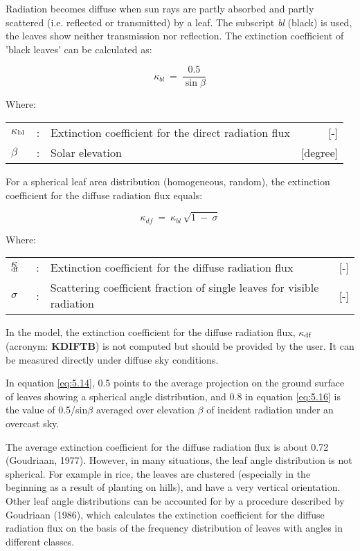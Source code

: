 Radiation becomes diffuse when sun rays are partly absorbed and partly scattered (i.e.
reflected or transmitted) by a leaf. The subscript {\it bl} (black) is used, the leaves show
neither transmission nor reflection. The extinction coefficient of 'black leaves'
can be calculated as:

\begin{equation}
\label{eq:5.14}
\kappa_{bl} ~=~{\frac{0.5}{\sin \beta }}
\end{equation}

Where:\\[5pt]
\begin{tabularx}{\textwidth}{llXr}
	$\kappa$$_{{\rm bl}}$ &:& Extinction coefficient for the direct radiation flux   &     [-]\\
	$\beta$ &:& Solar elevation    &    [degree]\\
\end{tabularx}

For a spherical leaf area distribution (homogeneous, random), the extinction coefficient
for the diffuse radiation flux equals:

\begin{equation}
\label{eq:5.15}
\kappa_{df} ~=~ \kappa_{bl} \, \sqrt{1~-~ \sigma }
\end{equation}

Where:\\[5pt]
\begin{tabularx}{\textwidth}{llXr}
	$\kappa$$_{{\rm df}}$ &:& Extinction coefficient for the diffuse radiation flux    &    [-]\\
	$\sigma$ &:& Scattering coefficient fraction of single leaves for 
	visible radiation    &    [-]\\
\end{tabularx}

In the model, the extinction coefficient for the diffuse radiation flux, 
{\bf $\kappa$$_{{\rm df}}$} (acronym: {\bf KDIFTB})
is not computed but should be provided by the user. It can be measured directly 
under diffuse sky conditions.

In equation \ref{eq:5.14}, 0.5 points to the average projection on the ground surface of leaves
showing a spherical angle distribution, and 0.8 in equation \ref{eq:5.16} is the value of 0.5/sin$\beta$
averaged over elevation $\beta$ of incident radiation under an overcast sky.

The average extinction coefficient for the diffuse radiation flux is about 0.72 (Goudriaan,
1977). However, in many situations, the leaf angle distribution is not spherical. For
example in rice, the leaves are clustered (especially in the beginning as a result of
planting on hills), and have a very vertical orientation. Other leaf angle distributions can
be accounted for by a procedure described by Goudriaan (1986), which calculates the
extinction coefficient for the diffuse radiation flux on the basis of the frequency 
distribution of leaves with angles in different classes.

